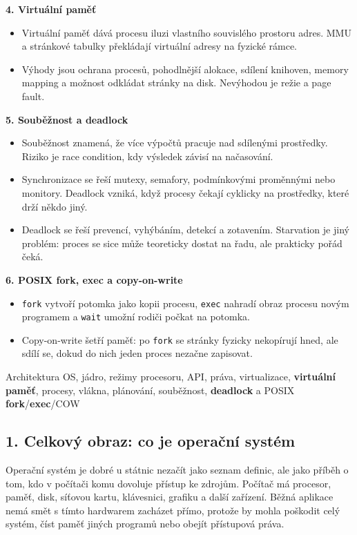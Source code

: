 \textbf{4. Virtuální paměť}
\begin{itemize}
  \item Virtuální paměť dává procesu iluzi vlastního souvislého prostoru adres. MMU a stránkové tabulky překládají virtuální adresy na fyzické rámce.
  \item Výhody jsou ochrana procesů, pohodlnější alokace, sdílení knihoven, memory mapping a možnost odkládat stránky na disk. Nevýhodou je režie a page fault.
\end{itemize}

\textbf{5. Souběžnost a deadlock}
\begin{itemize}
  \item Souběžnost znamená, že více výpočtů pracuje nad sdílenými prostředky. Riziko je race condition, kdy výsledek závisí na načasování.
  \item Synchronizace se řeší mutexy, semafory, podmínkovými proměnnými nebo monitory. Deadlock vzniká, když procesy čekají cyklicky na prostředky, které drží někdo jiný.
  \item Deadlock se řeší prevencí, vyhýbáním, detekcí a zotavením. Starvation je jiný problém: proces se sice může teoreticky dostat na řadu, ale prakticky pořád čeká.
\end{itemize}

\textbf{6. POSIX fork, exec a copy-on-write}
\begin{itemize}
  \item \texttt{fork} vytvoří potomka jako kopii procesu, \texttt{exec} nahradí obraz procesu novým programem a \texttt{wait} umožní rodiči počkat na potomka.
  \item Copy-on-write šetří paměť: po \texttt{fork} se stránky fyzicky nekopírují hned, ale sdílí se, dokud do nich jeden proces nezačne zapisovat.
\end{itemize}

Architektura OS, jádro, režimy procesoru, API, práva, virtualizace, \textbf{virtuální paměť}, procesy, vlákna, plánování, souběžnost, \textbf{deadlock} a POSIX \textbf{fork}/\textbf{exec}/COW

\subsection*{1. Celkový obraz: co je operační systém}

Operační systém je dobré u státnic nezačít jako seznam definic, ale jako příběh o tom, kdo v počítači komu dovoluje přístup ke zdrojům. Počítač má procesor, paměť, disk, síťovou kartu, klávesnici, grafiku a další zařízení. Běžná aplikace nemá smět s tímto hardwarem zacházet přímo, protože by mohla poškodit celý systém, číst paměť jiných programů nebo obejít přístupová práva.

